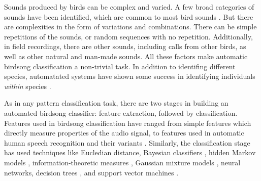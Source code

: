 \documentclass{article}
\begin{document}

Sounds produced by birds can be complex and varied. A few broad categories of
sounds have been identified, which are common to most bird sounds
\cite{brandes_automatedSoundRecording2008}. But there are complexities in the
form of variations and combinations. There can be simple repetitions of the
sounds, or random sequences with no repetition.  Additionally, in field
recordings, there are other sounds, including calls from other birds, as well as
other natural and man-made sounds. All these factors make automatic birdsong
classification a non-trivial task. In addition to identifing different species,
automatated systems have shown some success in identifying individuals
\emph{within} species \cite{kirschel_territorial2011}.

As in any pattern classification task, there are two stages in building an
automated birdsong classifier: feature extraction, followed by classification.
Features used in birdsong classification have ranged from simple features which
directly measure properties of the audio signal, to features used in automatic
human speech recognition and their variants \cite{somervuo_parametric2006,
tyagi_spectralEnsemble2006, graciarena_acousticFrontEnd2010, tan_sparse2012}. 
Similarly, the classification stage has used
techniques like Eucledian distance, Bayesian classifiers
\cite{lopes_largeSpecies2011}, hidden Markov models
\cite{chu_hmmBird2011, graciarena_acousticSequence2011},
information-theoretic measures \cite{wang_entropyBird2013}, Gaussian mixture models
\cite{lee_gmmImageShape2013}, neural networks\cite{mporas_automatedAcoustic2012}, 
decision trees \cite{neal_timeFreq2011}, and support vector machines
\cite{tan_sparse2012}.


\end{document}
